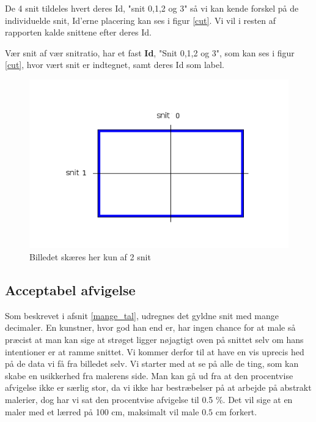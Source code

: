De 4 snit tildeles hvert deres Id, "snit 0,1,2 og 3" så vi kan kende
forskel på de individuelde snit, Id'erne placering kan ses i figur
\ref{cut}. Vi vil i resten af rapporten kalde snittene efter deres Id.

\begin{definition}
	Vær snit af vær snitratio, har et fast \textbf{Id}, "Snit 0,1,2 og 3", som kan ses i figur \ref{cut}, hvor vært snit er indtegnet, samt deres Id som label. 
\end{definition}

\begin{figure}[h]
	\begin{center}
		\includegraphics[scale=0.42,angle=0]{afsnit/vores_implementation/billeder/naiv_algoritme/2Cut}
	\end{center}
	\caption[]{Billedet skæres her kun af 2 snit}
	\label{2Cut}
\end{figure}

\subsection{Acceptabel afvigelse}

Som beskrevet i afsnit \ref{mange_tal}, udregnes
det gyldne snit med mange decimaler. En kunstner, hvor god han end er,
har ingen chance for at male så præcist at man kan sige at strøget
ligger nøjagtigt oven på snittet selv om hans intentioner er at ramme
snittet. Vi kommer derfor til at have en vis uprecis hed på de data vi
få fra billedet selv. Vi starter med at se på alle de ting, som kan
skabe en usikkerhed fra malerens side. Man kan gå ud fra at den
procentvise afvigelse ikke er særlig stor, da vi ikke har bestræbelser
på at arbejde på abstrakt malerier, dog har vi sat den procentvise
afvigelse til 0.5 \%. Det vil sige at en maler med et lærred på 100
cm, maksimalt vil male $0.5$ cm forkert.

